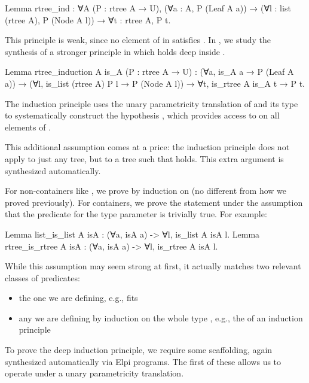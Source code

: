 \documentclass[a4paper, 11pt]{book}
\begin{document}
\begin{rocqcode}
Lemma rtree_ind : ∀A (P : rtree A → U),
  (∀a : A, P (Leaf A a)) →
  (∀l : list (rtree A), P (Node A l)) →
  ∀t : rtree A, P t.
\end{rocqcode}

This principle is weak, since no element of  in 
satisfies . In \cite{tassi:hal-01897468}, we study the synthesis of a
stronger principle in which  holds deep inside .

\begin{rocqcode}
Lemma rtree_induction A is_A (P : rtree A → U) :
  (∀a, is_A a → P (Leaf A a)) →
  (∀l, is_list (rtree A) P l → P (Node A l)) →
     ∀t, is_rtree A is_A t → P t.
\end{rocqcode}


The induction principle uses the unary parametricity translation of 
and its type to systematically construct the hypothesis
, which provides access to  on all
elements of .

This additional assumption comes at a price: the induction principle does not
apply to just any tree, but to a tree  such that
 holds. This extra argument is synthesized
automatically.

For non-containers like , we prove  by induction
on  (no different from how we proved  previously). For
containers, we prove the statement under the assumption that the predicate for
the type parameter is trivially true. For example:

\begin{rocqcode}
Lemma list_is_list A isA : (∀a, isA a) -> ∀l, is_list A isA l.
Lemma rtree_is_rtree A isA : (∀a, isA a) -> ∀l, is_rtree A isA l.
\end{rocqcode}

While this assumption may seem strong at first, it actually matches two
relevant classes of predicates:
\begin{itemize}
  \item the one we are defining, e.g.,  fits
  \item any  we are defining by induction on the whole type
    , e.g., the  of an induction principle
\end{itemize}

To prove the deep induction principle, we require some scaffolding, again
synthesized automatically via Elpi programs. The first of these allows us to
operate under a unary parametricity translation.
\end{document}
